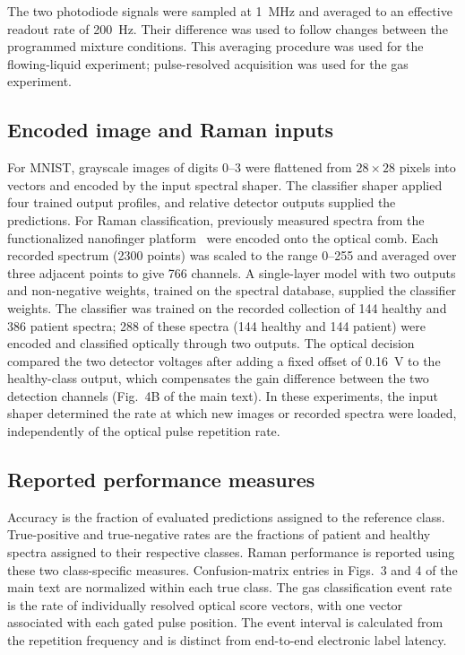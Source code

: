 \documentclass[11pt]{article}
\begin{document}
The two photodiode signals were sampled at 1~MHz and averaged to an effective readout rate of 200~Hz. Their difference was used to follow changes between the programmed mixture conditions. This averaging procedure was used for the flowing-liquid experiment; pulse-resolved acquisition was used for the gas experiment.

\subsection*{Encoded image and Raman inputs}
For MNIST, grayscale images of digits 0--3 were flattened from $28 \times 28$ pixels into vectors and encoded by the input spectral shaper. The classifier shaper applied four trained output profiles, and relative detector outputs supplied the predictions. For Raman classification, previously measured spectra from the functionalized nanofinger platform~\cite{zhang2025nanofinger,liu2023} were encoded onto the optical comb. Each recorded spectrum (2300 points) was scaled to the range 0--255 and averaged over three adjacent points to give 766 channels. A single-layer model with two outputs and non-negative weights, trained on the spectral database, supplied the classifier weights. The classifier was trained on the recorded collection of 144 healthy and 386 patient spectra; 288 of these spectra (144 healthy and 144 patient) were encoded and classified optically through two outputs. The optical decision compared the two detector voltages after adding a fixed offset of 0.16~V to the healthy-class output, which compensates the gain difference between the two detection channels (Fig.~4B of the main text). In these experiments, the input shaper determined the rate at which new images or recorded spectra were loaded, independently of the optical pulse repetition rate.

\subsection*{Reported performance measures}
Accuracy is the fraction of evaluated predictions assigned to the reference class. True-positive and true-negative rates are the fractions of patient and healthy spectra assigned to their respective classes. Raman performance is reported using these two class-specific measures. Confusion-matrix entries in Figs.~3 and 4 of the main text are normalized within each true class. The gas classification event rate is the rate of individually resolved optical score vectors, with one vector associated with each gated pulse position. The event interval is calculated from the repetition frequency and is distinct from end-to-end electronic label latency.



\end{document}

